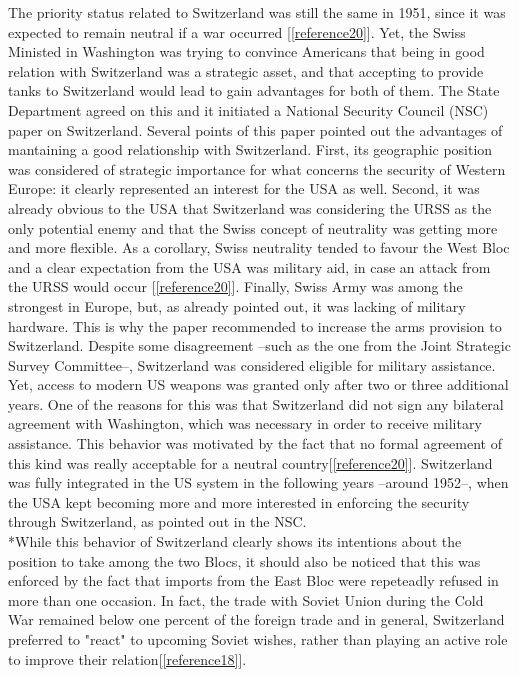 \documentclass[a4paper]{article}
\begin{document}
The priority status related to Switzerland was still the same in 1951, since it was expected to remain neutral if a war occurred [\ref{reference20}]. Yet, the Swiss Ministed in Washington was trying to convince Americans that being in good relation with Switzerland was a strategic asset, and that accepting to provide tanks to Switzerland would lead to gain advantages for both of them. The State Department agreed on this and it initiated a National Security Council (NSC) paper on Switzerland. Several points of this paper pointed out the advantages of mantaining a good relationship with Switzerland. First, its geographic position was considered of strategic importance for what concerns the security of Western Europe: it clearly represented an interest for the USA as well. Second, it was already obvious to the USA that Switzerland was considering the URSS as the only potential enemy and that the Swiss concept of neutrality was getting more and more flexible. As a corollary, Swiss neutrality tended to favour the West Bloc and a clear expectation from the USA was military aid, in case an attack from the URSS would occur [\ref{reference20}]. Finally, Swiss Army was among the strongest in Europe, but, as already pointed out, it was lacking of military hardware. This is why the paper recommended to increase the arms provision to Switzerland. Despite some disagreement --such as the one from the Joint Strategic Survey Committee--, Switzerland was considered eligible for military assistance. Yet, access to modern US weapons was granted only after two or three additional years. One of the reasons for this was that Switzerland did not sign any bilateral agreement with Washington, which was necessary in order to receive military assistance. This behavior was motivated by the fact that no formal agreement of this kind was really acceptable for a neutral country[\ref{reference20}]. Switzerland was fully integrated in the US system in the following years --around 1952--, when the USA kept becoming more and more interested in enforcing the security through Switzerland, as pointed out in the NSC.
\\*While this behavior of Switzerland clearly shows its intentions about the position to take among the two Blocs, it should also be noticed that this was enforced by the fact that imports from the East Bloc were repeteadly refused in more than one occasion. In fact, the trade with Soviet Union during the Cold War remained below one percent of the foreign trade and in general, Switzerland preferred to "react" to upcoming Soviet wishes, rather than playing an active role to improve their relation[\ref{reference18}].
\end{document}

